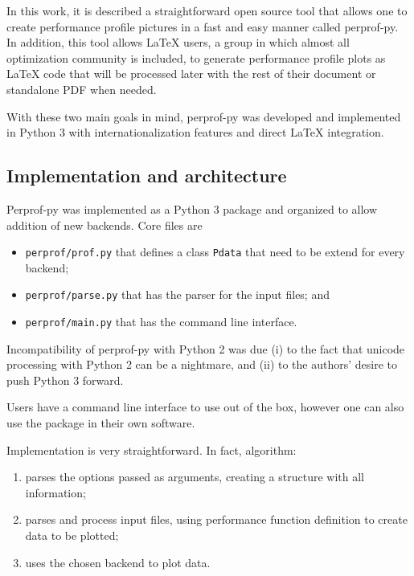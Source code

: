     In this work, it is described a straightforward open source tool that
    allows  one to create  performance profile pictures in a fast and easy
    manner called perprof-py.
    In addition, this tool  allows LaTeX users, a group in which almost
    all optimization community is included, to generate performance profile
    plots as LaTeX code that will be processed later  with the rest of their document 
    or standalone PDF when needed.

    With these two main goals in mind,  perprof-py was developed and 
    implemented in Python 3 with internationalization features and direct LaTeX
    integration.

\subsection*{Implementation and architecture}

    Perprof-py was implemented as a Python 3 package
    and organized to allow addition of new backends.
    Core files are
    \begin{itemize}
      \item {\tt perprof/prof.py} that defines a class {\tt Pdata} that need to
        be extend for every backend;
      \item {\tt perprof/parse.py} that has the parser for the input files; and
      \item {\tt perprof/main.py} that has the command line interface.
    \end{itemize}

    Incompatibility of perprof-py  with Python 2
    was due (i) to the fact that unicode processing with Python 2 can be a
    nightmare, and
    (ii) to the authors' desire to push Python 3 forward.

    Users have a command line interface to use out of the box,
    however one can also use the package in their own software.

    Implementation is very straightforward. In fact, algorithm:
    \begin{enumerate}
      \item parses the options passed as arguments, creating a
        structure with all  information;
      \item parses and process  input files, using  
         performance function definition to create  data to be plotted;
      \item uses the chosen backend to plot  data.
    \end{enumerate}

